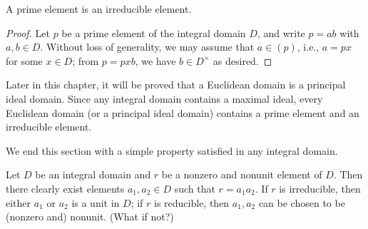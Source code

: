 \begin{prop}
    A prime element is an irreducible element.
\end{prop}
\begin{proof}
    Let $p$ be a prime element of the integral domain $D$, and write $p=ab$ with $a, b\in D$.
    Without loss of generality, we may assume that $a\in (p)$, i.e., $a=px$ for some $x\in D$; from $p=pxb$, we have $b\in D^\times$ as desired.
\end{proof}
\begin{rmk}
    Later in this chapter, it will be proved that a Euclidean domain is a principal ideal domain.
    Since any integral domain contains a maximal ideal, every Euclidean domain (or a principal ideal domain) contains a prime element and an irreducible element.
\end{rmk}

We end this section with a simple property satisfied in any integral domain.
\begin{obs}
    Let $D$ be an integral domain and $r$ be a nonzero and nonunit element of $D$.
    Then there clearly exist elements $a_1, a_2\in D$ such that $r=a_1a_2$.
    If $r$ is irreducible, then either $a_1$ or $a_2$ is a unit in $D$; if $r$ is reducible, then $a_1, a_2$ can be chosen to be (nonzero and) nonunit. \color{brown}(What if not?)\color{black}
\end{obs}